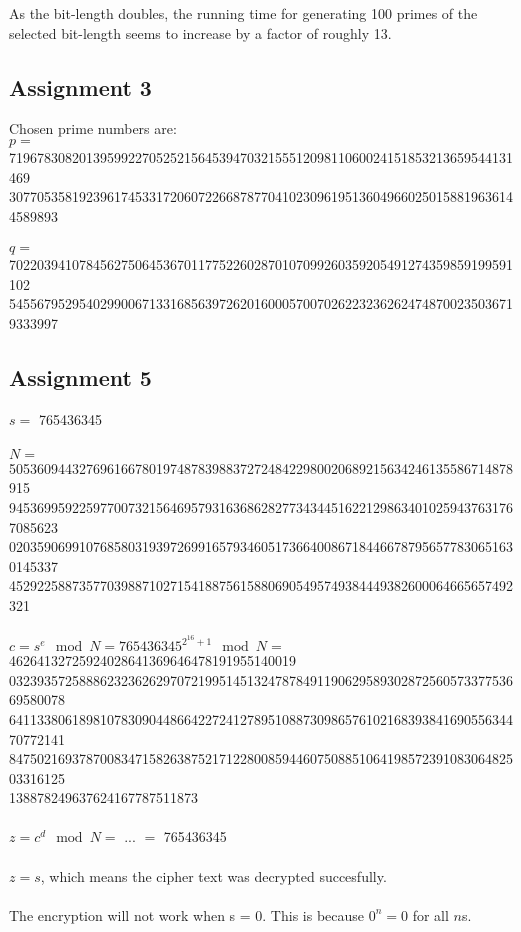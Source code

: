 \documentclass[11pt,a4paper]{article}
\begin{document}
As the bit-length doubles, the running time for generating 100 primes of the selected bit-length seems to increase by a factor of roughly 13.

\subsection{Assignment 3}
Chosen prime numbers are: \\
$p = $ 719678308201395992270525215645394703215551209811060024151853213659544131469\\3077053581923961745331720607226687877041023096195136049660250158819636144589893\\\\
$q = $ 702203941078456275064536701177522602870107099260359205491274359859199591102\\5455679529540299006713316856397262016000570070262232362624748700235036719333997
\subsection{Assignment 5}
$s = $ 765436345
\\\\$N =$ 505360944327696166780197487839883727248422980020689215634246135586714878915\\9453699592259770073215646957931636862827734344516221298634010259437631767085623\\0203590699107685803193972699165793460517366400867184466787956577830651630145337\\452922588735770398871027154188756158806905495749384449382600064665657492321 
\\\\$c = s^e\mod N = 765436345^{2^{16}+1} \mod N = $ 46264132725924028641369646478191955140019\\03239357258886232362629707219951451324787849119062958930287256057337753669580078\\64113380618981078309044866422724127895108873098657610216839384169055634470772141\\84750216937870083471582638752171228008594460750885106419857239108306482503316125\\138878249637624167787511873
\\\\$z = c^d\mod N = $ ... $ = $ 765436345
\\\\$z = s$, which means the cipher text was decrypted succesfully.
\\\\ 
The encryption will not work when s = 0. This is because $0^n = 0$ for all $n$s.
\end{document}
